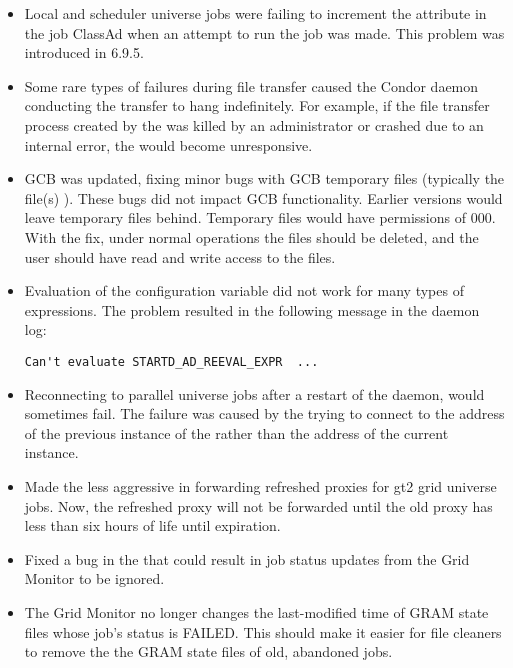 \begin{itemize}
\item Local and scheduler universe jobs were failing to increment the
 attribute in the job ClassAd when an attempt to run
the job was made.  This problem was introduced in 6.9.5.

\item Some rare types of failures during file transfer caused the
Condor daemon conducting the transfer to hang indefinitely.  For
example, if the file transfer process created by the 
was killed by an administrator or crashed due to an internal error,
the  would become unresponsive.

\item GCB was updated, fixing minor bugs with GCB temporary files 
(typically the file(s) ).
These bugs did not impact GCB functionality.  Earlier
versions would leave temporary files behind. Temporary files would have
permissions of 000.  With the fix, under normal operations the files should be
deleted, and the  user should have read and write access to the files.

\item Evaluation of the configuration variable 
did not work for many types of expressions.
The problem resulted in the following message in the 
 daemon log:

\begin{verbatim}
Can't evaluate STARTD_AD_REEVAL_EXPR  ...
\end{verbatim}

\item Reconnecting to parallel universe jobs after a restart of the
 daemon, would sometimes fail.  The failure was caused
by the  trying to connect to the address of the
previous instance of the  rather than the address of
the current instance.

\item Made the  less aggressive in forwarding refreshed
proxies for gt2 grid universe jobs. Now, the refreshed proxy will not be
forwarded until the old proxy has less than six hours of life until
expiration.

\item Fixed a bug in the  that could result in job
status updates from the Grid Monitor to be ignored.

\item The Grid Monitor no longer changes the last-modified time of GRAM
state files whose job's status is FAILED. This should make it easier for
file cleaners to remove the the GRAM state files of old, abandoned jobs.


\end{itemize}
